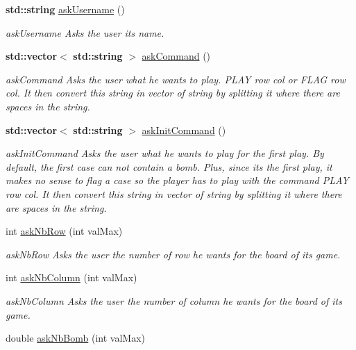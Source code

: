 \begin{DoxyCompactItemize}
\textbf{ std\+::string} \hyperlink{class_view_ae372864497e82f1abe7a3fc916af0d52}{ask\+Username} ()
\begin{DoxyCompactList}\small\item\em ask\+Username Asks the user its name. \end{DoxyCompactList}\item 
\textbf{ std\+::vector}$<$ \textbf{ std\+::string} $>$ \hyperlink{class_view_a12e92a6bdfb8a88d1e8e6b334f45ccc2}{ask\+Command} ()
\begin{DoxyCompactList}\small\item\em ask\+Command Asks the user what he wants to play. \textquotesingle{}P\+L\+AY row col\textquotesingle{} or \textquotesingle{}F\+L\+AG row col\textquotesingle{}. It then convert this string in vector of string by splitting it where there are spaces in the string. \end{DoxyCompactList}\item 
\textbf{ std\+::vector}$<$ \textbf{ std\+::string} $>$ \hyperlink{class_view_a543e9350656082efdb604ed224e65aa1}{ask\+Init\+Command} ()
\begin{DoxyCompactList}\small\item\em ask\+Init\+Command Asks the user what he wants to play for the first play. By default, the first case can not contain a bomb. Plus, since it\textquotesingle{}s the first play, it makes no sense to flag a case so the player has to play with the command \textquotesingle{}P\+L\+AY row col\textquotesingle{}. It then convert this string in vector of string by splitting it where there are spaces in the string. \end{DoxyCompactList}\item 
int \hyperlink{class_view_acbe5ecf3c0bdcd0971ba65fb8192ac6d}{ask\+Nb\+Row} (int val\+Max)
\begin{DoxyCompactList}\small\item\em ask\+Nb\+Row Asks the user the number of row he wants for the board of its game. \end{DoxyCompactList}\item 
int \hyperlink{class_view_a09d71faa86480f94e129fdf98cc7b0e0}{ask\+Nb\+Column} (int val\+Max)
\begin{DoxyCompactList}\small\item\em ask\+Nb\+Column Asks the user the number of column he wants for the board of its game. \end{DoxyCompactList}\item 
double \hyperlink{class_view_ada30dc373b340ac38470139af634f51c}{ask\+Nb\+Bomb} (int val\+Max)

\end{DoxyCompactItemize}
